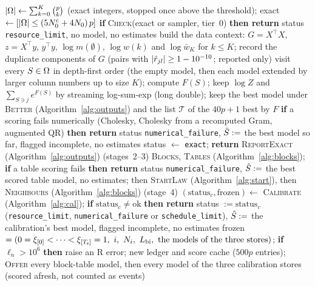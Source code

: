 \begin{algorithm}
{\begin{algorithmic}[1]
\State $\lvert \Omega\rvert\gets\sum_{k=0}^{K}\binom pk$ (exact integers, stopped once above the threshold); exact $\gets[\lvert \Omega\rvert\le(5N^{\mathrm c}_0+4N_0)\,p]$ %
\State \textbf{if} \textsc{Check}(exact or sampler, tier~$0$) \textbf{then return} status \texttt{resource\_limit}, no model, no estimates %
\State build the data context: $G=X^\top X$, $z=X^\top y$, $y^\top y$, $\log m(\emptyset)$, $\log w(k)$ and $\log\bar w_K$ for $k\le K$; record the duplicate components of $G$ (pairs with $\lvert \hat r_{jl}\rvert\ge1-10^{-10}$; reported only) %
\State visit every $S\in\Omega$ in depth-first order (the empty model, then each model extended by larger column numbers up to size $K$); compute $F(S)$; keep $\log Z$ and $\sum_{S\ni j}e^{F(S)}$ by streaming log-sum-exp (long double); keep the best model under \textsc{Better} (Algorithm~\ref{alg:outputs}) and the list $\mathcal T$ of the $40p+1$ best by $F$ %
\State \textbf{if} a scoring fails numerically (Cholesky, Cholesky from a recomputed Gram, augmented QR) \textbf{then return} status \texttt{numerical\_failure}, $\hat S:=$ the best model so far, flagged incomplete, no estimates %
\State status $\gets$ \texttt{exact}; \textbf{return} \textsc{ReportExact} (Algorithm~\ref{alg:outputs}) %
\EndIf
\State\label{ln:run-tabfail} (stages~2--3) \textsc{Blocks}, \textsc{Tables} (Algorithm~\ref{alg:blocks}); \textbf{if} a table scoring fails \textbf{then return} status \texttt{numerical\_failure}, $\hat S:=$ the best scored table model, no estimates; then \textsc{StartLaw} (Algorithm~\ref{alg:start}), then \textsc{Neighbours} (Algorithm~\ref{alg:blocks}) %
\State (stage~4) $(\text{status}_c,\text{frozen})\gets$ \textsc{Calibrate} (Algorithm~\ref{alg:cal}); \textbf{if} $\text{status}_c\ne\text{ok}$ \textbf{then return} status $:=\text{status}_c$ (\texttt{resource\_limit}, \texttt{numerical\_failure} or \texttt{schedule\_limit}), $\hat S:=$ the calibration's best model, flagged incomplete, no estimates %
\State\label{ln:run-frozen} frozen $=(0=\grid0<\dots<\grid{\Ts}=1,\ i,\ N_i,\ \Lbi,\ \text{the models of the three stores})$; \textbf{if} $\ell_n>10^6$ \textbf{then} raise an R error; new ledger and score cache ($500p$ entries); \textsc{Offer} every block-table model, then every model of the three calibration stores (scored afresh, not counted as events) %

\end{algorithmic}}
\end{algorithm}
